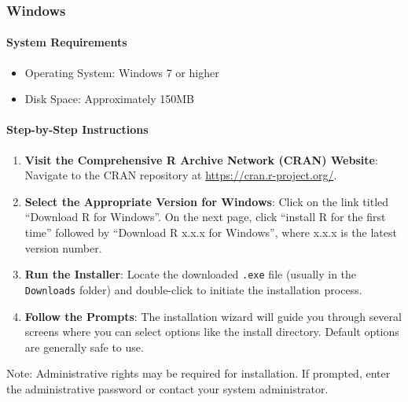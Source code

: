 \documentclass[
  b5paper]{book}
\newenvironment{Shaded}{\begin{snugshade}}{\end{snugshade}}
\newcommand{\NormalTok}[1]{#1}
\providecommand{\tightlist}{%
  \setlength{\itemsep}{0pt}\setlength{\parskip}{0pt}}
\begin{document}
\hypertarget{windows}{%
\subsubsection*{Windows}\label{windows}}

\hypertarget{system-requirements}{%
\paragraph*{System Requirements}\label{system-requirements}}

\begin{itemize}
\tightlist
\item
  Operating System: Windows 7 or higher
\item
  Disk Space: Approximately 150MB
\end{itemize}

\hypertarget{step-by-step-instructions}{%
\paragraph*{Step-by-Step Instructions}\label{step-by-step-instructions}}

\begin{enumerate}
\def\labelenumi{\arabic{enumi}.}
\item
  \textbf{Visit the Comprehensive R Archive Network (CRAN) Website}: Navigate to the CRAN repository at \url{https://cran.r-project.org/}.
\item
  \textbf{Select the Appropriate Version for Windows}: Click on the link titled ``Download R for Windows''. On the next page, click ``install R for the first time'' followed by ``Download R x.x.x for Windows'', where x.x.x is the latest version number.
\item
  \textbf{Run the Installer}: Locate the downloaded \texttt{.exe} file (usually in the \texttt{Downloads} folder) and double-click to initiate the installation process.
\item
  \textbf{Follow the Prompts}: The installation wizard will guide you through several screens where you can select options like the install directory. Default options are generally safe to use.
\end{enumerate}

\begin{Shaded}
\begin{Highlighting}[]
\NormalTok{Note: Administrative rights may be required for installation. If prompted, enter the administrative password or contact your system administrator.}
\end{Highlighting}
\end{Shaded}
\end{document}
